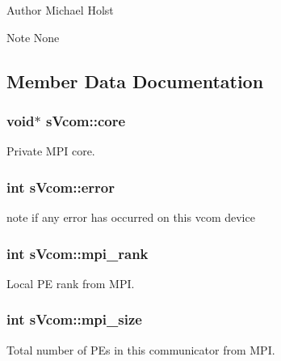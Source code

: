 \begin{DoxyAuthor}{Author}
Michael Holst 
\end{DoxyAuthor}
\begin{DoxyNote}{Note}
None 
\end{DoxyNote}


\subsection{Member Data Documentation}
\subsubsection[{core}]{\setlength{\rightskip}{0pt plus 5cm}void$\ast$ s\+Vcom\+::core}\label{a00001_ad4591b88c95fd3620d40f5568331c1f7}


Private M\+P\+I core. 

\subsubsection[{error}]{\setlength{\rightskip}{0pt plus 5cm}int s\+Vcom\+::error}\label{a00001_a0ccb38a7bc2fdb78dfb05987b5e86f18}


note if any error has occurred on this vcom device 

\subsubsection[{mpi\+\_\+rank}]{\setlength{\rightskip}{0pt plus 5cm}int s\+Vcom\+::mpi\+\_\+rank}\label{a00001_ae5090990cb02c43ed4ed25ecc1901ee2}


Local P\+E rank from M\+P\+I. 

\subsubsection[{mpi\+\_\+size}]{\setlength{\rightskip}{0pt plus 5cm}int s\+Vcom\+::mpi\+\_\+size}\label{a00001_a3370f33a730258e5174ba59b4b595cda}


Total number of P\+Es in this communicator from M\+P\+I. 

